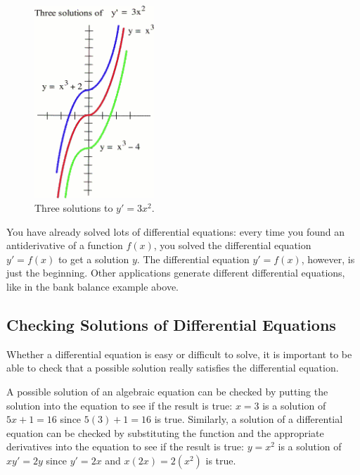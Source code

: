 \begin{figure}[!ht]
  \centering
    \includegraphics[width=0.4\textwidth]{img/chap5/image064.png}
    \caption{Three solutions to $y'=3x^2$.}
    \label{fig:5-9-solutioncurves}
\end{figure}
You have already solved lots of differential equations: every time you found an antiderivative of a function $f(x)$, you solved the differential equation $y'=f(x)$ to get a solution $y$. The differential equation $y'=f(x)$, however, is just the beginning. Other applications generate different differential equations, like in the bank balance example above.

\subsection{Checking Solutions of Differential Equations}
Whether a differential equation is easy or difficult to solve, it is important to be able to check that a possible solution really satisfies the differential equation.

A possible solution of an algebraic equation can be checked by putting the solution into the equation to see if the result is true: $x=3$ is a solution of $5x+1=16$ since $5(3)+1=16$ is true. Similarly, a solution of a differential equation can be checked by substituting the function and the appropriate derivatives into the equation to see if the result is true: $y=x^2$ is a solution of $xy'=2y$ since $y'=2x$ and $x(2x)=2(x^2)$ is true.

